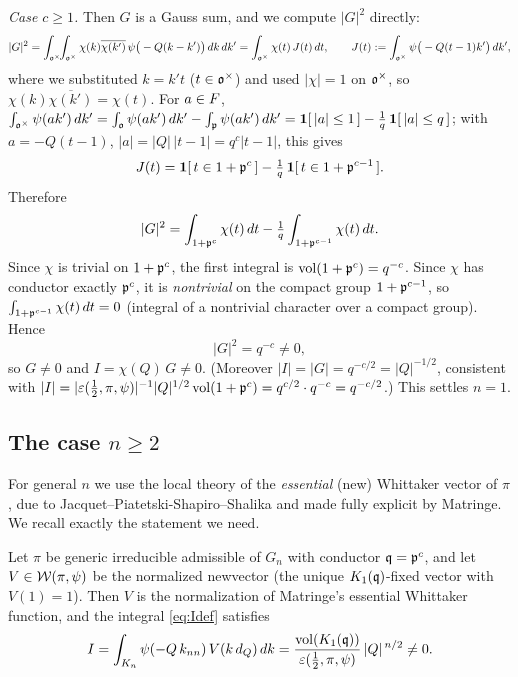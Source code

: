 \emph{Case $c\ge1$.} Then $G$ is a Gauss sum, and we compute $|G|^2$ directly:
\[
|G|^2=\int_{\mathfrak{o}^\times}\!\!\int_{\mathfrak{o}^\times}\chi(k)\overline{\chi(k')}\,
\psi\big(-Q(k-k')\big)\,dk\,dk'
=\int_{\mathfrak{o}^\times}\chi(t)\,J(t)\,dt,\qquad
J(t):=\int_{\mathfrak{o}^\times}\psi\big(-Q(t-1)k'\big)\,dk',
\]
where we substituted $k=k't$ \textup{(}$t\in\mathfrak{o}^\times$\textup{)} and used $|\chi|=1$ on
$\mathfrak{o}^\times$, so $\chi(k)\overline{\chi(k')}=\chi(t)$. For $a\in F$,
$\int_{\mathfrak{o}^\times}\psi(ak')\,dk'=\int_{\mathfrak{o}}\psi(ak')\,dk'-\int_{\mathfrak{p}}\psi(ak')\,dk'
=\mathbf 1[\,|a|\le1\,]-\tfrac1q\,\mathbf 1[\,|a|\le q\,]$; with $a=-Q(t-1)$, $|a|=|Q|\,|t-1|=q^{c}|t-1|$,
this gives
\[
J(t)=\mathbf 1[\,t\in1+\mathfrak{p}^{c}\,]-\tfrac1q\,\mathbf 1[\,t\in1+\mathfrak{p}^{c-1}\,].
\]
Therefore
\[
|G|^2=\int_{1+\mathfrak{p}^{c}}\chi(t)\,dt-\tfrac1q\int_{1+\mathfrak{p}^{c-1}}\chi(t)\,dt .
\]
Since $\chi$ is trivial on $1+\mathfrak{p}^{c}$, the first integral is
$\operatorname{vol}(1+\mathfrak{p}^{c})=q^{-c}$. Since $\chi$ has conductor exactly $\mathfrak{p}^{c}$, it is
\emph{nontrivial} on the compact group $1+\mathfrak{p}^{c-1}$, so $\int_{1+\mathfrak{p}^{c-1}}\chi(t)\,dt=0$
\textup{(}integral of a nontrivial character over a compact group\textup{)}. Hence
\[
|G|^2=q^{-c}\neq0,
\]
so $G\neq0$ and $I=\chi(Q)\,G\neq0$. \textup{(}Moreover $|I|=|G|=q^{-c/2}=|Q|^{-1/2}$, consistent
with $|I|=|\varepsilon(\tfrac12,\pi,\psi)|^{-1}|Q|^{1/2}\operatorname{vol}(1+\mathfrak{p}^{c})=q^{c/2}\cdot
q^{-c}=q^{-c/2}$.\textup{)} This settles $n=1$.

\subsection*{The case $n\ge2$}
For general $n$ we use the local theory of the \emph{essential} \textup{(}new\textup{)} Whittaker
vector of $\pi$, due to Jacquet--Piatetski-Shapiro--Shalika and made fully explicit by Matringe.
We recall exactly the statement we need.

\begin{qtwotheorem}\label{thm:newvector}
Let $\pi$ be generic irreducible admissible of $G_n$ with conductor $\mathfrak{q}=\mathfrak{p}^{c}$, and let
$V\in\mathcal{W}(\pi,\psi)$ be the normalized newvector \textup{(}the unique $K_1(\mathfrak{q})$-fixed
vector with $V(1)=1$\textup{)}. Then $V$ is the normalization of Matringe's essential Whittaker
function, and the integral \eqref{eq:Idef} satisfies
\begin{equation}\label{eq:matringe}
I=\int_{K_n}\psi(-Q\,k_{nn})\,V(k\,d_Q)\,dk
=\frac{\operatorname{vol}(K_1(\mathfrak{q}))}{\varepsilon(\tfrac12,\pi,\psi)}\,|Q|^{\,n/2}\neq0 .
\end{equation}
\end{qtwotheorem}

